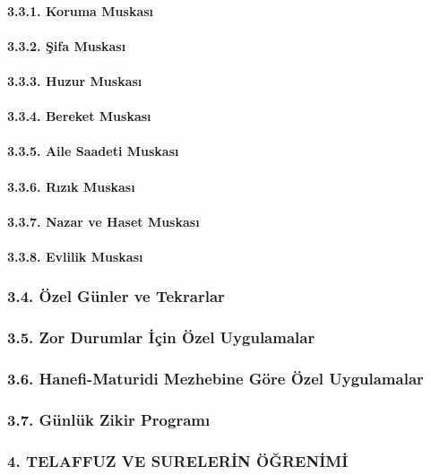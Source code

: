 \documentclass[12pt,a4paper]{article}
\begin{document}
\paragraph{3.3.1. Koruma Muskası}
\paragraph{3.3.2. Şifa Muskası}
\paragraph{3.3.3. Huzur Muskası}
\paragraph{3.3.4. Bereket Muskası}
\paragraph{3.3.5. Aile Saadeti Muskası}
\paragraph{3.3.6. Rızık Muskası}
\paragraph{3.3.7. Nazar ve Haset Muskası}
\paragraph{3.3.8. Evlilik Muskası}
\subsubsection{3.4. Özel Günler ve Tekrarlar}
\subsubsection{3.5. Zor Durumlar İçin Özel Uygulamalar}
\subsubsection{3.6. Hanefi-Maturidi Mezhebine Göre Özel Uygulamalar}
\subsubsection{3.7. Günlük Zikir Programı}
\subsubsection{4. TELAFFUZ VE SURELERİN ÖĞRENİMİ}
\end{document}
